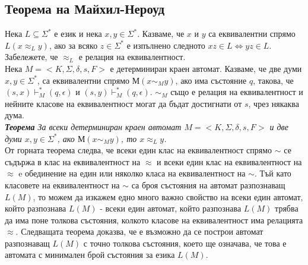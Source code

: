 \documentclass[11pt]{article}
\begin{document}
\subsection{Теорема на Майхил-Нероуд}
 Нека $L \subseteq \Sigma^{*}$ е език и нека $x, y \in \Sigma^{*}$. Казваме, че $x$ и $y$ са еквивалентни спрямо $L (x \approx_{L} y)$, ако за всяко $z \in \Sigma^{*}$ е изпълнено следното $xz \in L \iff yz \in L$. Забележете, че $\approx_{L}$ е релация на еквивалентност. \\

 Нека $M = <K, \Sigma, \delta, s, F>$ е детерминиран краен автомат. Казваме, че две думи $x, y \in \Sigma^{*}$, са еквивалентни спрямо $М (x \sim_{M} y)$, ако има състояние $q$, такова, че $(s, x) \vdash^{*}_{M} (q, \epsilon)$ и $(s, y) \vdash^{*}_{M} (q, \epsilon)$. $\sim_{M}$ също е релация на еквивалентност и нейните класове на еквивалентност могат да бъдат достигнати от $s$, чрез някаква дума.\\ 

\theorem \emph{\textbf{Теорема} За всеки детерминиран краен автомат $M = <K, \Sigma, \delta, s, F>$ и две думи $x, y \in \Sigma^{*}$, ако $М (x \sim_{M} y)$, то $x \approx_{L} y$.}\\

От горната теорема следва, че всеки един клас на еквивалентност спрямо $\sim$ се съдържа в клас на еквивалентност на $\approx$ и всеки един клас на еквивалентност на $\approx$ e обединение на един или няколко класа на еквивалентност на $\sim$. Тъй като класовете на еквивалентност на $\sim$ са броя състояния на автомат разпознаващ $L(M)$, то можем да изкажем едно много важно свойство на всеки един автомат, който разпознава $L(M)$ - всеки един автомат, който разпознава $L(M)$ трябва да има поне толкова състояния, колкото класове на еквивалентност има релацията $\approx$. Следващата теорема доказва, че е възможно да се построи автомат разпознаващ $L(M)$ с точно толкова състояния, което ще означава, че това е автомата с минимален брой състояния за езика $L(M)$.\\
\end{document}

